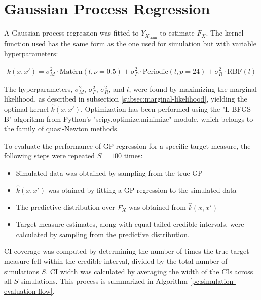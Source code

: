 \section{Gaussian Process Regression}\label{sec:evaluation-gaussian-process-regression}

A Gaussian process regression was fitted to $Y_{X_{\text{train}}}$ to estimate $F_X$.
The kernel function used has the same form as the one used for simulation
but with variable hyperparameters:

\begin{gather*}\label{def:gp_fit}
    k(x, x') = \sigma_M^2 \cdot \text{Matérn}(l, \nu=0.5) +
               \sigma_P^2 \cdot \text{Periodic}(l, p=24) +
               \sigma_R^2 \cdot \text{RBF}(l)
\end{gather*}

The hyperparameters, $\sigma_M^2$, $\sigma_P^2$, $\sigma_R^2$, and $l$, were found by
maximizing the marginal likelihood, as described in subsection
\ref{subsec:marginal-likelihood}, yielding the optimal kernel $\hat{k}(x, x')$.
Optimization has been performed using the "L-BFGS-B" algorithm from Python's
"scipy.optimize.minimize" module, which belongs
to the family of quasi-Newton methods.


To evaluate the performance of GP regression for a specific target measure,
the following steps were repeated $S=100$ times:
\begin{itemize}
    \item  Simulated data was obtained by sampling from the true GP
    \item  $\hat{k}(x, x')$ was otained by fitting a GP regression to the simulated data
    \item  The predictive distribution over $F_X$ was obtained from $\hat{k}(x, x')$
    \item  Target measure estimates, along with equal-tailed credible intervals, were calculated by sampling from the predictive distribution.
\end{itemize}
CI coverage was computed by determining the number of times the true target measure fell within the credible interval,
divided by the total number of simulations $S$.
CI width was calculated by averaging the width of the CIs across all $S$ simulations.
This process is summarized in Algorithm \ref{pc:simulation-evaluation-flow}.


